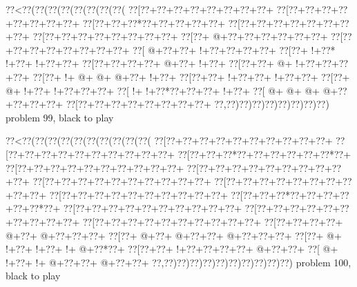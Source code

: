 \vbox{\vbox{\goo
\0??<\0??(\0??(\0??(\0??(\0??(\0??(\0??(\0??(
\0??[\0??+\0??+\0??+\0??+\0??+\0??+\0??+\0??+
\0??[\0??+\0??+\0??+\0??+\0??+\0??+\0??+\0??+
\0??[\0??+\0??+\0??*\0??+\0??+\0??+\0??+\0??+
\0??[\0??+\0??+\0??+\0??+\0??+\0??+\0??+\0??+
\0??[\0??+\0??+\0??+\0??+\0??+\0??+\0??+\0??+
\0??[\0??+\- @+\0??+\0??+\0??+\0??+\0??+\0??+
\0??[\0??+\0??+\0??+\0??+\0??+\0??+\0??+\0??+
\0??[\- @+\0??+\0??+\- !+\0??+\0??+\0??+\0??+
\0??[\0??+\- !+\0??*\- !+\0??+\- !+\0??+\0??+
\0??[\0??+\0??+\0??+\0??+\- @+\0??+\- !+\0??+
\0??[\0??+\0??+\- @+\- !+\0??+\0??+\0??+\0??+
\0??[\0??+\- !+\- @+\- @+\- @+\0??+\- !+\0??+
\0??[\0??+\0??+\- !+\0??+\0??+\- !+\0??+\0??+
\0??[\0??+\- @+\- !+\0??+\- !+\0??+\0??+\0??+
\0??[\- !+\- !+\0??*\0??+\0??+\0??+\- !+\0??+
\0??[\- @+\- @+\- @+\- @+\0??+\0??+\0??+\0??+
\0??[\0??+\0??+\0??+\0??+\0??+\0??+\0??+\0??+
\0??,\0??)\0??)\0??)\0??)\0??)\0??)\0??)\0??)
}
\hfil problem 99, black to play\hfil\break
}

\vbox{\vbox{\goo
\0??<\0??(\0??(\0??(\0??(\0??(\0??(\0??(\0??(\0??(\0??(
\0??[\0??+\0??+\0??+\0??+\0??+\0??+\0??+\0??+\0??+\0??+
\0??[\0??+\0??+\0??+\0??+\0??+\0??+\0??+\0??+\0??+\0??+
\0??[\0??+\0??+\0??*\0??+\0??+\0??+\0??+\0??+\0??*\0??+
\0??[\0??+\0??+\0??+\0??+\0??+\0??+\0??+\0??+\0??+\0??+
\0??[\0??+\0??+\0??+\0??+\0??+\0??+\0??+\0??+\0??+\0??+
\0??[\0??+\0??+\0??+\0??+\0??+\0??+\0??+\0??+\0??+\0??+
\0??[\0??+\0??+\0??+\0??+\0??+\0??+\0??+\0??+\0??+\0??+
\0??[\0??+\0??+\0??+\0??+\0??+\0??+\0??+\0??+\0??+\0??+
\0??[\0??+\0??+\0??*\0??+\0??+\0??+\0??+\0??+\0??*\0??+
\0??[\0??+\0??+\0??+\0??+\0??+\0??+\0??+\0??+\0??+\0??+
\0??[\0??+\0??+\0??+\0??+\0??+\0??+\0??+\0??+\0??+\0??+
\0??[\0??+\0??+\0??+\0??+\0??+\0??+\0??+\0??+\0??+\0??+
\0??[\0??+\0??+\0??+\0??+\- @+\0??+\- @+\0??+\0??+\0??+
\0??[\0??+\- @+\0??+\- @+\0??+\0??+\- @+\0??+\0??+\0??+
\0??[\0??+\- @+\- !+\0??+\- !+\0??+\- !+\- @+\0??*\0??+
\0??[\0??+\0??+\- !+\0??+\0??+\0??+\0??+\- @+\0??+\0??+
\0??[\- @+\- !+\0??+\- !+\- @+\0??+\0??+\- @+\0??+\0??+
\0??,\0??)\0??)\0??)\0??)\0??)\0??)\0??)\0??)\0??)\0??)
}
\hfil problem 100, black to play\hfil\break
}

